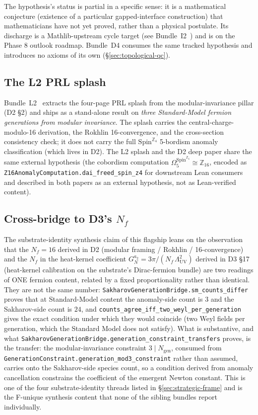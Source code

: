 \documentclass[aps,prd,reprint,nofootinbib,superscriptaddress]{revtex4-2}
\begin{document}
The hypothesis's status is partial in a specific sense: it is a
mathematical conjecture (existence of a particular gapped-interface
construction) that mathematicians have not yet proved, rather than a
physical postulate. Its discharge is a Mathlib-upstream cycle target
(see Bundle~I2~\cite{Roehm2026Strategy}) and is on the Phase 8 outlook
roadmap. Bundle~D4 consumes the same tracked hypothesis and
introduces no axioms of its own (\S\ref{sec:topological-qc}).

\subsection{The L2 PRL splash}

Bundle~L2~\cite{Roehm2026Modular} extracts the four-page PRL splash
from the modular-invariance pillar (D2 \S 2) and ships as a stand-alone
result on \emph{three Standard-Model fermion generations from modular
invariance}. The splash carries the central-charge-modulo-16 derivation,
the Rokhlin 16-convergence, and the cross-section consistency check;
it does not carry the full $\mathrm{Spin}^{\mathbb{Z}_4}$ 5-bordism
anomaly classification (which lives in D2). The L2 splash and the
D2 deep paper share the same external hypothesis (the cobordism
computation $\Omega_5^{\mathrm{Spin}^{\mathbb{Z}_4}} \cong
\mathbb{Z}_{16}$, encoded as
\texttt{Z16AnomalyComputation.dai\_freed\_spin\_z4} for downstream
Lean consumers and described in both papers as an external
hypothesis, not as Lean-verified content).

\subsection{Cross-bridge to D3's $N_f$}

The substrate-identity synthesis claim of this flagship leans on the
observation that the $N_f = 16$ derived in D2 (modular framing /
Rokhlin / 16-convergence) and the $N_f$ in the heat-kernel coefficient
$G_N^{a_2} = 3\pi/(N_f\,\Lambda_{\mathrm{UV}}^{2})$ derived
in D3 \S 17 (heat-kernel calibration on the substrate's Dirac-fermion
bundle) are two readings of ONE fermion content, related by a fixed
proportionality rather than identical. They are not the same number:
\texttt{SakharovGenerationBridge.sm\_counts\_differ} proves that at
Standard-Model content the anomaly-side count is $3$ and the
Sakharov-side count is $24$, and
\texttt{counts\_agree\_iff\_two\_weyl\_per\_generation} gives the exact
condition under which they would coincide (two Weyl fields per
generation, which the Standard Model does not satisfy). What is
substantive, and what
\texttt{SakharovGenerationBridge.generation\_constraint\_transfers}
proves, is the transfer: the modular-invariance constraint
$3 \mid N_{\mathrm{gen}}$, consumed from
\texttt{GenerationConstraint.generation\_mod3\_constraint} rather than
assumed, carries onto the Sakharov-side species count, so a condition derived
from anomaly cancellation constrains the coefficient of the emergent
Newton constant. This is one of the four substrate-identity
threads listed in \S\ref{sec:strategic-frame} and is the F-unique
synthesis content that none of the sibling bundles report individually.
\end{document}
